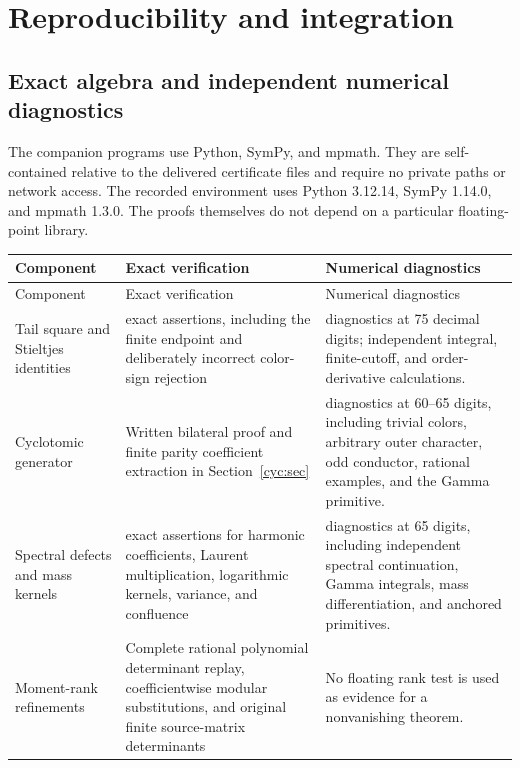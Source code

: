 \section{Reproducibility and integration}
\label{verify:section}

\subsection{Exact algebra and independent numerical diagnostics}

The companion programs use Python, SymPy, and mpmath. They are
self-contained relative to the delivered certificate files and require
no private paths or network access. The recorded environment uses
Python 3.12.14, SymPy 1.14.0, and mpmath 1.3.0. The proofs themselves
do not depend on a particular floating-point library.

\begin{longtable}{@{}>{\raggedright\arraybackslash}p{}>{\raggedright\arraybackslash}p{}>{\raggedright\arraybackslash}p{}@{}}
\toprule
Component & Exact verification & Numerical diagnostics\\
\midrule
\endfirsthead
\toprule Component & Exact verification & Numerical diagnostics\\\midrule
\endhead
Tail square and Stieltjes identities & 96 exact assertions, including
the finite endpoint and deliberately incorrect color-sign rejection &
29 diagnostics at 75 decimal digits; independent integral, finite-cutoff,
and order-derivative calculations.\\[5pt]
Cyclotomic generator & Written bilateral proof and finite parity
coefficient extraction in Section~\ref{cyc:sec} & 12 diagnostics at
60--65 digits, including trivial colors, arbitrary outer character,
odd conductor, rational examples, and the Gamma primitive.\\[5pt]
Spectral defects and mass kernels & 194 exact assertions for harmonic
coefficients, Laurent multiplication, logarithmic kernels, variance,
and confluence & 21 diagnostics at 65 digits, including independent
spectral continuation, Gamma integrals, mass differentiation, and
anchored primitives.\\[5pt]
Moment-rank refinements & Complete rational polynomial determinant
replay, coefficientwise modular substitutions, and original finite
source-matrix determinants & No floating rank test is used as evidence
for a nonvanishing theorem.\\
\bottomrule
\end{longtable}

